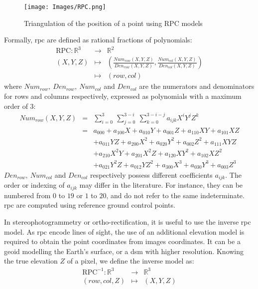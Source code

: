 \begin{figure}
    \centering
    \texttt{[image: Images/RPC.png]}
    \caption{Triangulation of the position of a point using RPC models}
    \label{fig:RPC}
\end{figure}

Formally, \acrshort{rpc} are defined as rational fractions of polynomials:  
\begin{eqnarray*}
    \mathrm{RPC}:\mathbb{R}^3 &\rightarrow&\mathbb{R}^2\\
    (X,Y,Z) 	&\mapsto& \left(\frac{Num_{row}(X,Y,Z)}{Den_{row}(X,Y,Z)}, \frac{Num_{col}(X,Y,Z)}{Den_{col}(X,Y,Z)}\right)\\
    &\mapsto&(row,col)
\end{eqnarray*}
where $Num_{row},~Den_{row},~Num_{col}$ and $Den_{col}$ are the numerators and denominators for rows and columns respectively, expressed as polynomials with a maximum order of $3$:
\begin{eqnarray*}
    Num_{row}(X,Y,Z) &=& \sum_{i=0}^3~\sum_{j=0}^{3-i}~\sum_{k=0}^{3-i-j}a_{ijk}X^iY^jZ^k\\
    &=& a_{000} + a_{100} X + a_{010} Y + a_{001} Z + a_{110} XY + a_{101} XZ \\
    &&+ a_{011} YZ + a_{200} X^2 + a_{020} Y^2 + a_{002} Z^2 + a_{111} XYZ \\
    && + a_{210} X^2Y + a_{201} X^2Z + a_{120} XY^2 + a_{102} XZ^2\\
    && + a_{021} Y^2Z + a_{012} YZ^2 + a_{300} X^3 + a_{030} Y^3 + a_{003} Z^3
\end{eqnarray*}
$Den_{row},~Num_{col}$ and $Den_{col}$ respectively possess different coefficients $a_{ijk}$. The order or indexing of $a_{ijk}$ may differ in the literature. For instance, they can be numbered from $0$ to $19$ or $1$ to $20$, and do not refer to the same indeterminate. \acrshort{rpc} are computed using reference ground control points.

In stereophotogrammetry or ortho-rectification, it is useful to use the inverse \acrshort{rpc} model. As \acrshort{rpc} encode lines of sight, the use of an additional elevation model is required to obtain the point coordinates from images coordinates. It can be a geoid modelling the Earth's surface, or a \acrshort{dsm} with higher resolution. Knowing the true elevation $Z$ of a pixel, we define the inverse model as:
\begin{eqnarray*}
    \mathrm{RPC}^{-1}:\mathbb{R}^3 &\rightarrow&\mathbb{R}^3\\
    (row, col, Z) 	&\mapsto& (X,Y,Z)
\end{eqnarray*}

